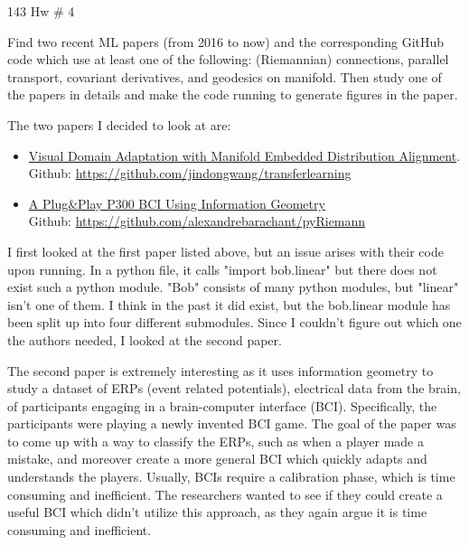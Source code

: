 \documentclass[12pt,letterpaper,boxed]{math_hw_pset}
\begin{document}
\begin{center}
    143 Hw \# 4
\end{center}

\begin{exercise}[Problem 1.]
    Find two recent ML papers (from 2016 to now) and the corresponding GitHub code which use at least one of the following: 
    (Riemannian) connections, parallel transport, covariant derivatives, and geodesics on manifold.  
    Then study one of the papers in details and make the code running to generate figures in the paper.
\end{exercise}

\begin{solution}
    The two papers I decided to look at are: 
    \begin{itemize}
        \item \href{https://arxiv.org/pdf/1807.07258v2.pdf}{Visual Domain Adaptation with Manifold Embedded
        Distribution Alignment}.\\
        Github: \url{https://github.com/jindongwang/transferlearning}
        \item \href{https://arxiv.org/pdf/1409.0107v1.pdf}{A Plug\&Play P300 BCI Using Information
        Geometry}\\
        Github: \url{https://github.com/alexandrebarachant/pyRiemann}
    \end{itemize}
    I first looked at the first paper listed above, but an issue arises with their code upon running. In a python file, 
    it calls "import bob.linear" but there does not exist such a python module. "Bob" consists of many python 
    modules, but "linear" isn't one of them. I think in the past it 
    did exist, but the bob.linear module has been split up into four different submodules. Since I couldn't 
    figure out which one the authors needed, I looked at the second paper. 

    The second paper is extremely interesting as it uses information geometry to study a dataset of ERPs (event related potentials), 
    electrical data from the brain, of participants engaging in a brain-computer interface (BCI). Specifically, 
    the participants were playing a newly invented BCI game. The goal of the paper was to 
    come up with a way to classify the ERPs, such as when a player made a mistake, and moreover 
    create a more general BCI which quickly adapts and understands the players. Usually, BCIs require a calibration 
    phase, which is time consuming and inefficient. The researchers wanted to see if they could create a 
    useful BCI which didn't utilize this approach, as they again argue it is time consuming and inefficient. 


\end{solution}
\end{document}
